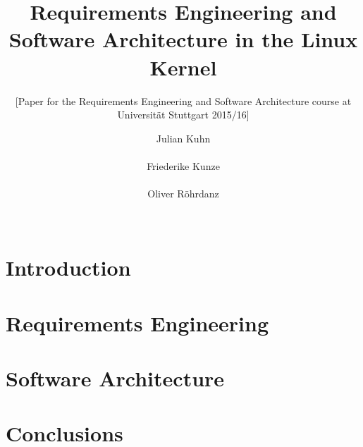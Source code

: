 \documentclass{sig-alternate-05-2015}
\begin{document}
\title{Requirements Engineering and Software Architecture in the Linux Kernel}
\subtitle{[Paper for the Requirements Engineering and Software Architecture course at Universität Stuttgart 2015/16]}

\author{
    \alignauthor Julian Kuhn\\
        \\
    \alignauthor Friederike Kunze\\
        \\
    \alignauthor Oliver R{\"o}hrdanz\\
        \\
}

\maketitle

\begin{abstract}
\end{abstract}

%
\begin{CCSXML}
\end{CCSXML}




\printccsdesc{}


\section{Introduction}

\section{Requirements Engineering}

\section{Software Architecture}

\section{Conclusions}



\balancecolumns{}
\end{document}
